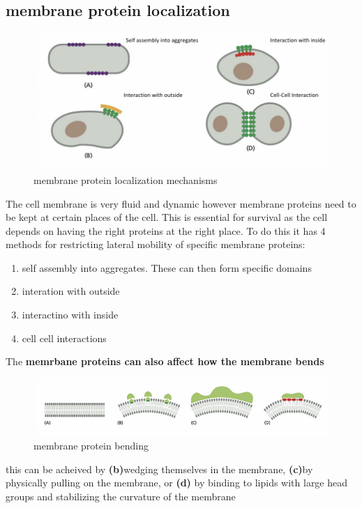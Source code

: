 \documentclass[../main.tex]{subfiles}
\begin{document}
\subsection{membrane protein localization}
\begin{figure}
    \centering
    \includegraphics[width=0.5\linewidth]{localization.png}
    \caption{membrane protein localization mechanisms}
    \label{fig:enter-label}
\end{figure}

The cell membrane is very fluid and dynamic however membrane proteins need to be kept at certain places of the cell. This is essential for survival as the cell depends on having the right proteins at the right place. To do this it has 4 methods for restricting lateral mobility of specific membrane proteins:

\begin{enumerate}
    \item self assembly into aggregates. These can then form specific domains
    \item interation with outside 
    \item interactino with inside
    \item cell cell interactions
\end{enumerate}

The\textbf{ memrbane proteins can also affect how the membrane bends}

\begin{figure}[H]
    \centering
    \includegraphics[width=\linewidth]{bending.png}
    \caption{membrane protein bending}
    \label{fig:enter-label}
\end{figure}
this can be acheived by  \textbf{(b)}wedging themselves in the membrane, \textbf{(c)}by physically pulling on the membrane, or \textbf{(d)} by binding to lipids with large head groups and stabilizing the curvature of the membrane 
\end{document}
